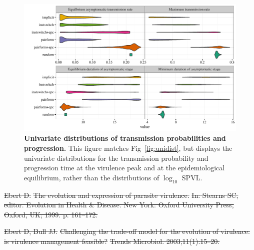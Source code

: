 \documentclass[10pt,letterpaper]{article}
\renewcommand{\figurename}{Fig}
\newcommand{\Lspvl}{$\log_{10}$ SPVL}
\providecommand{\DIFdeltex}[1]{{\protect\color{red}\sout{#1}}}                      %
\providecommand{\DIFdelbegin}{} %
\providecommand{\DIFdel}[1]{\texorpdfstring{\DIFdeltex{#1}}{}} %
\newcommand{\DIFscaledelfig}{0.5}
\newlength{\DIFdelgraphicswidth} %
\newlength{\DIFdelgraphicsheight} %
\newcommand{\DIFdelincludegraphics}[2][]{%
\sbox{\DIFdelgraphicsbox}{\DIFOincludegraphics[#1]{#2}}%
\settoboxwidth{\DIFdelgraphicswidth}{\DIFdelgraphicsbox} %
\settoboxtotalheight{\DIFdelgraphicsheight}{\DIFdelgraphicsbox} %
\scalebox{\DIFscaledelfig}{%
\parbox[b]{\DIFdelgraphicswidth}{\usebox{\DIFdelgraphicsbox}\\[-\baselineskip] \rule{\DIFdelgraphicswidth}{0em}}\llap{\resizebox{\DIFdelgraphicswidth}{\DIFdelgraphicsheight}{%
\setlength{\unitlength}{\DIFdelgraphicswidth}%
\begin{picture}(1,1)%
\thicklines\linethickness{2pt} %
{\color[rgb]{1,0,0}\put(0,0){\framebox(1,1){}}}%
{\color[rgb]{1,0,0}\put(0,0){\line( 1,1){1}}}%
{\color[rgb]{1,0,0}\put(0,1){\line(1,-1){1}}}%
\end{picture}%
}\hspace*{3pt}}} %
} %
\DeclareRobustCommand{\DIFdelbegin}{\DIFOdelbegin \let\includegraphics\DIFdelincludegraphics} %
\begin{document}
\begin{figure}[!ht]
  \includegraphics[width=\textwidth]{../figures/fig_S2_3.pdf}
\caption{{\bf Univariate distributions of transmission probabilities and progression.}
This figure matches \figurename~\ref{fig:unidist}, but displays the
univariate distributions for the transmission probability and 
progression time at the virulence
peak and at the epidemiological equilibrium,
rather than the distributions of \Lspvl.
}
\label{fig:tranprogsum}
\end{figure}

\nolinenumbers

%
%
% 

\DIFdelbegin %

\DIFdel{Ebert D.
}%
\DIFdel{The evolution and expression of parasite virulence.
}%
\DIFdel{In: Stearns SC, editor. Evolution in Health \& Disease. New York:
  Oxford University Press, Oxford, UK; 1999. p. 161--172.
}%

\DIFdel{Ebert D, Bull JJ.
}%
\DIFdel{Challenging the trade-off model for the evolution of virulence: is
  virulence management feasible?
}%
\DIFdel{Trends Microbiol. 2003;11(1):15--20.
}%
\end{document}
